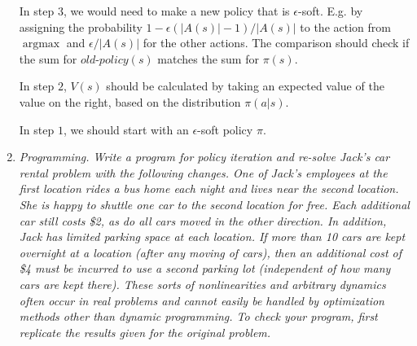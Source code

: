 \documentclass[12pt,a4paper]{article}
\DeclareMathOperator*{\argmax}{argmax}
\begin{document}
\begin{enumerate}
    In step $3$, we would need to make a new policy that is $\epsilon$-soft. E.g. by
    assigning the probability $1 - \epsilon(|A(s)| - 1)/|A(s)|$ to the action from $\argmax$
    and $\epsilon/|A(s)|$ for the other actions. The comparison should check if
    the sum for $\textit{old-policy}(s)$ matches the sum for $\pi(s)$.

    In step $2$, $V(s)$ should be calculated by taking an expected value of the value
    on the right, based on the distribution $\pi(a|s)$.

    In step $1$, we should start with an $\epsilon$-soft policy $\pi$.

  \item
    \textit{Programming. Write a program for policy iteration and re-solve Jack’s car
    rental problem with the following changes. One of Jack’s employees at the first location
    rides a bus home each night and lives near the second location. She is happy to shuttle
    one car to the second location for free. Each additional car still costs \$2, as do all cars
    moved in the other direction. In addition, Jack has limited parking space at each location.
    If more than 10 cars are kept overnight at a location (after any moving of cars), then an
    additional cost of \$4 must be incurred to use a second parking lot (independent of how
    many cars are kept there). These sorts of nonlinearities and arbitrary dynamics often
    occur in real problems and cannot easily be handled by optimization methods other than
    dynamic programming. To check your program, first replicate the results given for the
    original problem.}


\end{enumerate}
\end{document}
